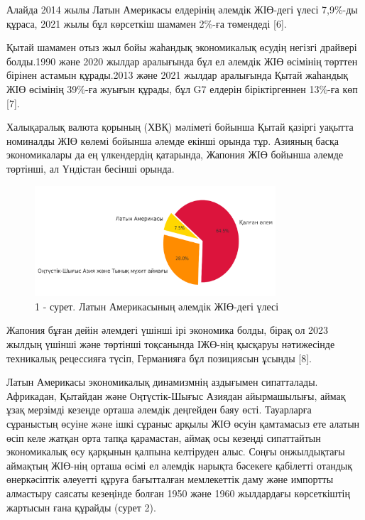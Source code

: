 \begin{multicols}{2}
Алайда 2014 жылы Латын Америкасы елдерінің әлемдік ЖІӨ-дегі үлесі
7,9\%-ды құраса, 2021 жылы бұл көрсеткіш шамамен 2\%-ға төмендеді
{[}6{]}.

Қытай шамамен отыз жыл бойы жаһандық экономикалық өсудің негізгі
драйвері болды.1990 және 2020 жылдар аралығында бұл ел әлемдік ЖІӨ
өсімінің төрттен бірінен астамын құрады.2013 және 2021 жылдар
аралығында Қытай жаһандық ЖІӨ өсімінің 39\%-ға жуығын құрады, бұл G7
елдерін біріктіргеннен 13\%-ға көп {[}7{]}.

Халықаралық валюта қорының (ХВҚ) мәліметі бойынша Қытай қазіргі уақытта
номиналды ЖІӨ көлемі бойынша әлемде екінші орында тұр. Азияның басқа
экономикалары да ең үлкендердің қатарында, Жапония ЖІӨ бойынша әлемде
төртінші, ал Үндістан бесінші орында.
\end{multicols}

\begin{figure}[H]
	\centering
	\includegraphics[width=0.8\textwidth]{media/ekon2/image51}
	\caption*{1 - сурет. Латын Америкасының әлемдік ЖІӨ-дегі үлесі}
\end{figure}

\begin{multicols}{2}
Жапония бұған дейін әлемдегі үшінші ірі экономика болды, бірақ ол 2023
жылдың үшінші және төртінші тоқсанында ІЖӨ-нің қысқаруы нәтижесінде
техникалық рецессияға түсіп, Германияға бұл позициясын ұсынды {[}8{]}.

Латын Америкасы экономикалық динамизмнің аздығымен сипатталады.
Африкадан, Қытайдан және Оңтүстік-Шығыс Азиядан айырмашылығы, аймақ ұзақ
мерзімді кезеңде орташа әлемдік деңгейден баяу өсті. Тауарларға
сұраныстың өсуіне және ішкі сұраныс арқылы ЖІӨ өсуін қамтамасыз ете
алатын өсіп келе жатқан орта тапқа қарамастан, аймақ осы кезеңді
сипаттайтын экономикалық өсу қарқынын қалпына келтіруден алыс. Соңғы
онжылдықтағы аймақтың ЖІӨ-нің орташа өсімі ел әлемдік нарықта бәсекеге
қабілетті отандық өнеркәсіптік әлеуетті құруға бағытталған мемлекеттік
даму және импортты алмастыру саясаты кезеңінде болған 1950 және 1960
жылдардағы көрсеткіштің жартысын ғана құрайды (сурет 2).
\end{multicols}

